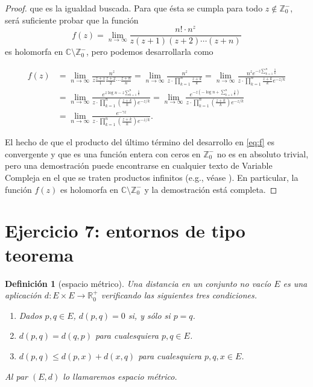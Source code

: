 \documentclass[a4paper,10pt]{article}
\theoremstyle{teorema}
\newtheorem{defi}[teor]{Definición}
\theoremstyle{plano}
\theoremstyle{titulo}
\begin{document}
\begin{proof}
que es la igualdad buscada. Para que ésta se cumpla para todo $z\notin\mathbb{Z}_0^-$, será suficiente probar que la función 
\[f(z)=\lim_{n\rightarrow\infty}\frac{n!\cdot n^{z}}{z(z+1)(z+2)\cdots(z+n)}\]
es holomorfa en $\mathbb{C}\setminus\mathbb{Z}_0^-$, pero podemos desarrollarla como

\begin{align}
    f(z)&=\lim_{n\to\infty}\frac{n^z}{z\frac{z+1}{1}\frac{z+2}{2}\cdots\frac{z+n}{n}}=\lim_{n\to\infty}\frac{n^z}{z\cdot\prod_{k=1}^n\frac{z+k}{k}}=\lim_{n\to\infty}\frac{n^z e^{-z\sum_{k=1}^n\frac{1}{k}}}{z\cdot\prod_{k=1}^n\frac{z+k}{k}e^{-z/k}}\nonumber \\
    &=\lim_{n\to\infty}\frac{ e^{z\log n-z\sum_{k=1}^n\frac{1}{k}}}{z\cdot\prod_{k=1}^n\left(\frac{z+k}{k}\right)e^{-z/k}}=\lim_{n\to\infty}\frac{ e^{-z\left(-\log n+\sum_{k=1}^n\frac{1}{k}\right)}}{z\cdot\prod_{k=1}^n\left(\frac{z+k}{k}\right)e^{-z/k}} \nonumber \\
    &=\lim_{n\to\infty}\frac{ e^{-\gamma z}}{z\cdot\prod_{k=1}^n\left(\frac{z+k}{k}\right)e^{-z/k}}. \label{eq:f}
\end{align}

El hecho de que el producto del último término del desarrollo en \eqref{eq:f} es convergente y que es una función entera con ceros en $\mathbb{Z}_0^-$ no es en absoluto trivial, pero una demostración puede encontrarse en cualquier texto de Variable Compleja en el que se traten productos infinitos (e.g., véase \cite{rudin}). En particular, la función $f(z)$ es holomorfa en $\mathbb{C}\setminus\mathbb{Z}_0^-$ y la demostración está completa.
\end{proof}

\section{Ejercicio 7: entornos de tipo teorema}


\begin{defi}[espacio métrico]
Una distancia en un conjunto no vacío $E$ es una aplicación $d:E\times E\rightarrow\mathbb{R}^+_0$ verificando las siguientes tres condiciones.

\begin{enumerate}[label=\textup{(\roman*)}]
    \item Dados $p,q\in E$,  $d(p,q)=0$ si, y sólo si $p=q$.
    \item  $d(p,q)=d(q,p)$ para cualesquiera $p,q\in E$.
    \item  $d(p,q)\leq d(p,x)+d(x,q)$ para cualesquiera $p,q,x\in E$.
\end{enumerate}

Al par $(E,d)$ lo llamaremos \emph{espacio métrico}.

\end{defi}
\end{document}
